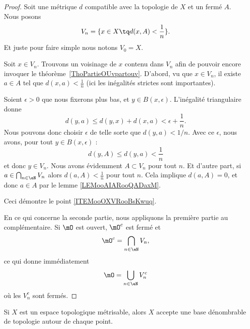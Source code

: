 \begin{proof}
	Soit une métrique \( d\) compatible avec la topologie de \( X\) et un fermé \( A\). Nous posons
	\begin{equation}
		V_n=\{ x\in X\tq d(x,A)<\frac{1}{ n } \}.
	\end{equation}
	Et juste pour faire simple nous notons \( V_0=X\).
	\begin{subproof}
		Soit \( x\in V_n\). Trouvons un voisinage de \( x\) contenu dans \( V_n\) afin de pouvoir encore invoquer le théorème~\ref{ThoPartieOUvpartouv}. D'abord, vu que \( x\in V_n\), il existe \( a\in A\) tel que \( d(x,a)<\frac{ 1 }{ n }\) (ici les inégalités strictes sont importantes).

		Soient \( \epsilon>0\) que nous fixerons plus bas, et \( y\in B(x,\epsilon)\). L'inégalité triangulaire donne
		\begin{equation}
			d(y,a)\leq d(y,x)+d(x,a)<\epsilon+\frac{1}{ n }.
		\end{equation}
		Nous pouvons donc choisir \( \epsilon\) de telle sorte que \( d(y,a)<1/n\). Avec ce \( \epsilon\), nous avons, pour tout \( y\in B(x,\epsilon)\) :
		\begin{equation}
			d(y,A)\leq d(y,a)<\frac{1}{ n }
		\end{equation}
		et donc \( y\in V_n\).
		Nous avons évidemment \( A\subset V_n\) pour tout \( n\). Et d'autre part, si \( a\in\bigcap_{n\in \eN} V_n\) alors \( d(a,A)<\frac{1}{ n }\) pour tout \( n\). Cela implique \( d(a,A)=0\), et donc \( a\in A\) par le lemme \ref{LEMooAIARooQADaxM}.
	\end{subproof}

	Ceci démontre le point \ref{ITEMooOXVRooBsKwuq}.

	En ce qui concerne la seconde partie, nous appliquons la première partie au complémentaire. Si \( \mO\) est ouvert, \( \mO^c\) est fermé et
	\begin{equation}
		\mO^c=\bigcap_{n\in \eN}V_n,
	\end{equation}
	ce qui donne immédiatement
	\begin{equation}
		\mO=\bigcup_{n\in \eN}V_n^c
	\end{equation}
	où les \( V_n^c\) sont fermés.
\end{proof}

\begin{corollary}       \label{CORooTWFYooCNMieM}
	Si \( X\) est un espace topologique métrisable, alors \( X\) accepte une base dénombrable de topologie autour de chaque point.
\end{corollary}

